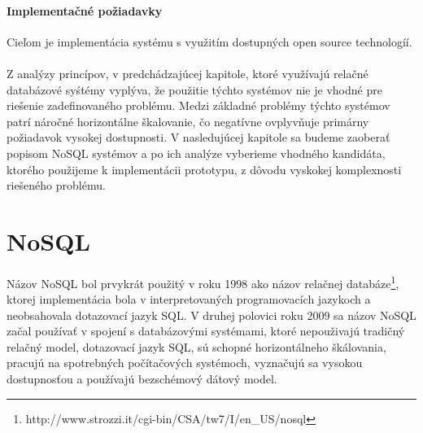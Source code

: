 \documentclass[11pt,twoside,a4paper]{book}
\begin{document}
\subsubsection*{Implementačné požiadavky}
Cieľom je implementácia systému s využitím dostupných open source technologíí. 

\subsubsection*{}
Z analýzy princípov, v predchádzajúcej kapitole, ktoré využívajú relačné databázové syśtémy vyplýva, že použitie týchto systémov nie je vhodné pre riešenie zadefinovaného problému. Medzi základné problémy týchto systémov patrí náročné horizontálne škalovanie, čo negatívne ovplyvňuje primárny požiadavok vysokej dostupnosti. V nasledujúcej kapitole sa budeme zaoberať popisom NoSQL systémov a po ich analýze vyberieme vhodného kandidáta, ktorého použijeme k implementácii prototypu, z dôvodu vyskokej komplexnosti riešeného problému.





\chapter{NoSQL}
\label{chapter:NoSQL}
Názov NoSQL bol prvykrát použitý v roku 1998 ako názov relačnej databáze\footnote{http://www.strozzi.it/cgi-bin/CSA/tw7/I/en\_US/nosql}, ktorej implementácia bola v interpretovaných programovacích jazykoch a neobsahovala dotazovací jazyk SQL. V druhej polovici roku 2009 sa názov NoSQL začal používať v spojení s databázovými systémami, ktoré nepouživajú tradičný relačný model, dotazovací jazyk SQL, sú schopné horizontálneho škálovania, pracujú na spotrebných počítačových systémoch, vyznačujú sa vysokou dostupnosťou a používajú bezschémový dátový model.
\end{document}
